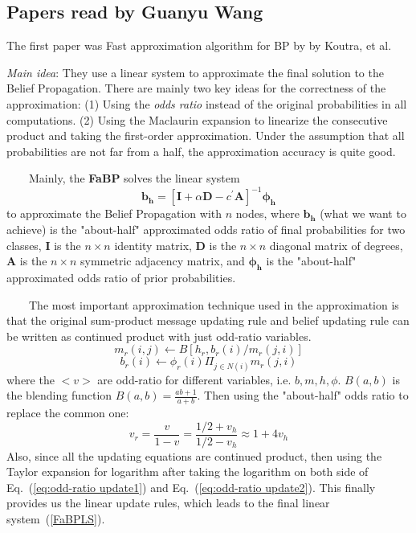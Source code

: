 \subsection{Papers read by Guanyu Wang}
The first paper was Fast approximation algorithm for BP by by Koutra, et al.
\cite{KoutraKKCPF11}
\begin{itemize*}
\item {\em Main idea}:
They use a linear system to approximate the final solution to the Belief Propagation. There are mainly two key ideas for the correctness of the approximation: (1) Using the \emph{odds ratio} instead of the original probabilities in all computations. (2) Using the Maclaurin expansion to linearize the consecutive product and taking the first-order approximation. Under the assumption that all probabilities are not far from a half, the approximation accuracy is quite good.

~~~~Mainly, the \textbf{FaBP} solves the linear system
\begin{equation}
\label{FaBPLS}
\mathbf{b_h}=[\mathbf{I}+\alpha \mathbf{D} - c^{\prime}\mathbf{A}]^{-1}\mathbf{\phi_h}
\end{equation}
to approximate the Belief Propagation with $n$ nodes, where $\mathbf{b_h}$ (what we want to achieve) is the "about-half" approximated odds ratio of final probabilities for two classes, $\mathbf{I}$ is the $n \times n$ identity matrix, $\mathbf{D}$ is the $n \times n$ diagonal matrix of degrees, $\mathbf{A}$ is the $n \times n$ symmetric adjacency matrix, and $\mathbf{\phi_h}$ is the "about-half" approximated odds ratio of prior probabilities.

~~~~The most important approximation technique used in the approximation is that the original sum-product message updating rule and belief updating rule can be written as continued product with just odd-ratio variables.
\begin{equation}
\label{eq:odd-ratio update1}
m_r(i,j)\leftarrow B[h_r, b_r(i)/m_r(j,i)]
\end{equation}
\begin{equation}
\label{eq:odd-ratio update2}
b_r(i)\leftarrow \phi_r(i)\Pi_{j\in N(i)}m_r(j,i)
\end{equation}
where the $<v>$ are odd-ratio for different variables, i.e. $b, m, h, \phi$. $B(a,b)$ is the blending function $B(a,b) = \frac{ab+1}{a+b}$. Then using the "about-half" odds ratio  to replace the common one:
\begin{equation}
\label{eq:odd-ratio approximate}
v_r=\frac{v}{1-v}= \frac{1/2+v_h}{1/2-v_h}\approx 1+4v_h
\end{equation}
Also, since all the updating equations are continued product, then using the Taylor expansion for logarithm after taking the logarithm on both side of Eq.~(\ref{eq:odd-ratio update1}) and Eq.~(\ref{eq:odd-ratio update2}). This finally provides us the linear update rules, which leads to the final linear system~(\ref{FaBPLS}).


\end{itemize*}
